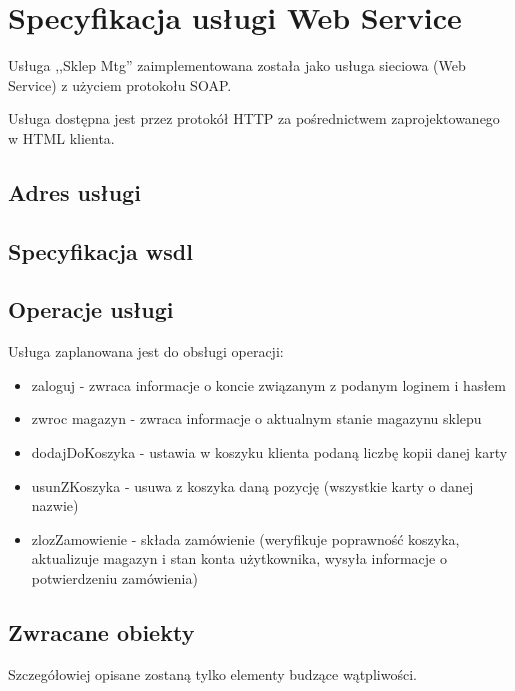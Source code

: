 \documentclass[11pt]{article}   %
\begin{document}
\section{Specyfikacja usługi Web Service}
Usługa ,,Sklep Mtg'' zaimplementowana została jako usługa sieciowa (Web
Service) z użyciem protokołu SOAP. \par
Usługa dostępna jest przez protokół HTTP za pośrednictwem zaprojektowanego w HTML klienta.
	\subsection{Adres usługi}
	
	\subsection{Specyfikacja wsdl}

\subsection{Operacje usługi}
Usługa zaplanowana jest do obsługi operacji:
\begin{itemize}
	\item zaloguj - zwraca informacje o koncie związanym z podanym loginem i hasłem
	\item zwroc magazyn - zwraca informacje o aktualnym stanie magazynu sklepu
	\item dodajDoKoszyka - ustawia w koszyku klienta podaną liczbę kopii danej karty
	\item usunZKoszyka - usuwa z koszyka daną pozycję (wszystkie karty o danej nazwie)
	\item zlozZamowienie - składa zamówienie (weryfikuje poprawność koszyka, aktualizuje magazyn i stan konta użytkownika, wysyła informacje o potwierdzeniu zamówienia)
\end{itemize}
\subsection{Zwracane obiekty}
Szczegółowiej opisane zostaną tylko elementy budzące wątpliwości.
\end{document}
